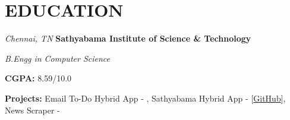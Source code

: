 \section{EDUCATION}
\begin{twocolentry}{
    \textit{Chennai, TN}}
    \textbf{Sathyabama Institute of Science \& Technology}

    \textit{B.Engg in Computer Science}
\end{twocolentry}
    
\vspace{0.10 cm}

\begin{onecolentry}
    \begin{highlights}
        \item \textbf{CGPA:} 8.59/10.0 
        \item \textbf{Projects:} 
            {Email To-Do Hybrid App - {}},  
            {Sathyabama Hybrid App - { {[\underline {GitHub}]}}}, 
            {News Scraper - {}}
        \end{highlights}
\end{onecolentry}
